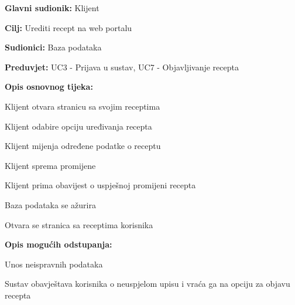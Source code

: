 					\noindent {}
					\begin{packed_item}
	
						\item \textbf{Glavni sudionik: } Klijent
						\item  \textbf{Cilj:} Urediti recept na web portalu
						\item  \textbf{Sudionici:} Baza podataka
						\item  \textbf{Preduvjet:} UC3 - Prijava u sustav, UC7 - Objavljivanje recepta
						\item  \textbf{Opis osnovnog tijeka:}
						
						\item[] \begin{packed_enum}
							
							\item Klijent otvara stranicu sa svojim receptima
							\item Klijent odabire opciju uređivanja recepta
							\item Klijent mijenja određene podatke o receptu
							\item Klijent sprema promijene
							\item Klijent prima obavijest o uspješnoj promijeni recepta
							\item Baza podataka se ažurira
							\item Otvara se stranica sa receptima korisnika
						\end{packed_enum}

						\item  \textbf{Opis mogućih odstupanja:}
						
						\item[] \begin{packed_item}
	
							\item[3.a] Unos neispravnih podataka
							\item[] \begin{packed_enum}
								
								\item Sustav obavještava korisnika o neuspjelom upisu i vraća ga
								na opciju za objavu recepta
								
							\end{packed_enum}
						\end{packed_item}
					\end{packed_item}

